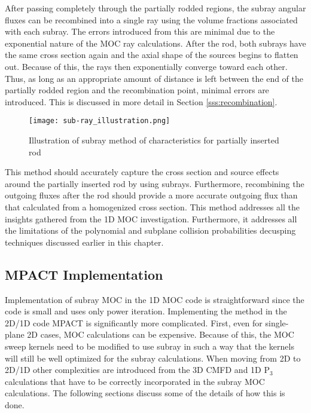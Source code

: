 After passing completely through the partially rodded regions, the subray angular fluxes can be recombined into a single ray using the volume fractions associated with each subray.  The errors introduced from this are minimal due to the exponential nature of the MOC ray calculations.  After the rod, both subrays have the same cross section again and the axial shape of the sources begins to flatten out.  Because of this, the rays then exponentially converge toward each other.  Thus, as long as an appropriate amount of distance is left between the end of the partially rodded region and the recombination point, minimal errors are introduced.  This is discussed in more detail in Section \ref{sss:recombination}.

\begin{figure}
    \centering
    \texttt{[image: sub-ray\_illustration.png]}
    \caption[Subray MOC Illustration]{Illustration of subray method of characteristics for partially inserted rod}\label{f:subrayMOC}
\end{figure}

This method should accurately capture the cross section and source effects around the partially inserted rod by using subrays.  Furthermore, recombining the outgoing fluxes after the rod should provide a more accurate outgoing flux than that calculated from a homogenized cross section.  This method addresses all the insights gathered from the 1D MOC investigation.  Furthermore, it addresses all the limitations of the polynomial and subplane collision probabilities decusping techniques discussed earlier in this chapter.

\subsection{MPACT Implementation}

Implementation of subray MOC in the 1D MOC code is straightforward since the code is small and uses only power iteration.  Implementing the method in the 2D/1D code MPACT is significantly more complicated.  First, even for single-plane 2D cases, MOC calculations can be expensive.  Because of this, the MOC sweep kernels need to be modified to use subray in such a way that the kernels will still be well optimized for the subray calculations.  When moving from 2D to 2D/1D other complexities are introduced from the 3D CMFD and 1D P$_3$ calculations that have to be correctly incorporated in the subray MOC calculations.  The following sections discuss some of the details of how this is done.

